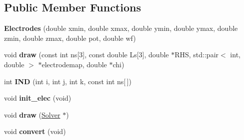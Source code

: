 \subsection*{Public Member Functions}
\begin{DoxyCompactItemize}
\item 
{\bfseries Electrodes} (double xmin, double xmax, double ymin, double ymax, double zmin, double zmax, double pot, double wf)\hypertarget{classElectrodes_a12bc882b867578f0d5eda8b37d12d1c9}{}\label{classElectrodes_a12bc882b867578f0d5eda8b37d12d1c9}

\item 
void {\bfseries draw} (const int ns\mbox{[}3\mbox{]}, const double Ls\mbox{[}3\mbox{]}, double $\ast$R\+HS, std\+::pair$<$ int, double $>$ $\ast$electrodemap, double $\ast$chi)\hypertarget{classElectrodes_adef3789e846c1a32649a19644ab3e3ed}{}\label{classElectrodes_adef3789e846c1a32649a19644ab3e3ed}

\item 
int {\bfseries I\+ND} (int i, int j, int k, const int ns\mbox{[}$\,$\mbox{]})\hypertarget{classElectrodes_ae07a4e2c75b9885bdecddcbab30a3be8}{}\label{classElectrodes_ae07a4e2c75b9885bdecddcbab30a3be8}

\item 
void {\bfseries init\+\_\+elec} (void)\hypertarget{classElectrodes_a9aa7054acb3919f872193cd1e46f603a}{}\label{classElectrodes_a9aa7054acb3919f872193cd1e46f603a}

\item 
void {\bfseries draw} (\hyperlink{classSolver}{Solver} $\ast$)\hypertarget{classElectrodes_a9323a73943b0876b880bbb7fd9a7ec96}{}\label{classElectrodes_a9323a73943b0876b880bbb7fd9a7ec96}

\item 
void {\bfseries convert} (void)\hypertarget{classElectrodes_a2202532f07ca52a3c8574fe955f48218}{}\label{classElectrodes_a2202532f07ca52a3c8574fe955f48218}

\end{DoxyCompactItemize}
